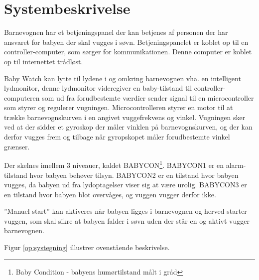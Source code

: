 \chapter{Systembeskrivelse}

Barnevognen har et betjeningspanel der kan betjenes af personen der har ansvaret for babyen der skal vugges i søvn. Betjeningspanelet er koblet op til en controller-computer, som sørger for kommunikationen. Denne computer er koblet op til internettet trådløst. 

Baby Watch kan lytte til lydene i og omkring barnevognen vha. en intelligent lydmonitor, denne lydmonitor videregiver en baby-tilstand til controller-computeren som ud fra forudbestemte værdier sender signal til en microcontroller som styrer og regulerer vugningen. Microcontrolleren styrer en motor til at trække barnevognskurven i en angivet vuggefrekvens og vinkel. Vugningen sker ved at der sidder et gyroskop der måler vinklen på barnevognskurven, og der kan derfor vugges frem og tilbage når gyropskopet måler forudbestemte vinkel grænser.

Der skelnes imellem 3 niveauer, kaldet BABYCON\footnote{Baby Condition - babyens humørtilstand målt i gråd}. BABYCON1 er en alarm-tilstand hvor babyen behøver tilsyn. BABYCON2 er en tilstand hvor babyen vugges, da babyen ud fra lydoptagelser viser sig at være urolig. BABYCON3 er en tilstand hvor babyen blot overvåges, og vuggen vugger derfor ikke. 

''Manuel start'' kan aktiveres når babyen ligges i barnevognen og herved starter vuggen, som skal sikre at babyen falder i søvn uden der står en og aktivt vugger barnevognen. 

Figur \ref{op:systegning} illustrer ovenstående beskrivelse. 

